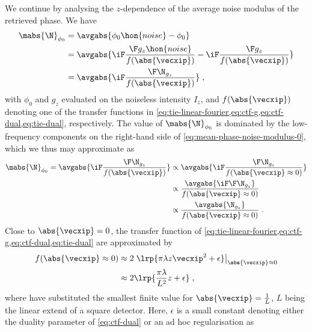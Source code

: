\documentclass[
twoside,
openright,
titlepage,
numbers=noenddot,
headinclude,
fleqn,
a4paper,
footinclude=true,
cleardoublepage=empty,
abstractoff,
BCOR=5mm,
paper=a4,
fontsize=11pt,
british,ngerman,american,
]{scrreprt}
\begin{document}
We continue by analysing the $z$-dependence of the average noise
modulus of the retrieved phase.  We have
\begin{equation}
  \label{eq:mean-phase-noise-modulus-0}
  \begin{split}
      \mabs{\N}_{\phi_0} & = \avgabs{\phi_0\hon{noise}-\phi_0}
      \\ &= \avgabs{ \iF\frac{\F g_z\hon{noise}}{f(\abs{\vecxip})} 
      -\iF\frac{\F g_z}{f(\abs{\vecxip})} }
  \\ & =\avgabs{ \iF\frac{\F \N_{g_z}}{f(\abs{\vecxip})} } \;,
  \end{split}
\end{equation}
with $\phi_0$ and $g_z$ evaluated on the noiseless intensity $I_z$,
and $f(\abs{\vecxip})$ denoting one of the transfer functions in
\cref{eq:tie-linear-fourier,eq:ctf-g,eq:ctf-dual,eq:tie-dual},
respectively.  The value of $\mabs{\N}_{\phi_0}$ is dominated by the
low-frequency components on the right-hand side of
\cref{eq:mean-phase-noise-modulus-0}, which we thus may approximate as
\begin{equation}
  \label{eq:mean-phase-noise-modulus-1}
  \begin{split}
    \mabs{\N}_{\phi_0} = 
    \avgabs{ \iF\frac{\F \N_{g_z}}{f(\abs{\vecxip})} }
    & \propto \avgabs{ \iF\frac{\F \N_{g_z}}
      { f(\abs{\vecxip}\approx 0) } }
    \\ & \propto \frac{\avgabs{ \iF \F\N_{g_z} }}
    {f(\abs{\vecxip}\approx 0)} 
    \\ & \propto \frac{\avgabs{ \N_{g_z} }}
    {f(\abs{\vecxip}\approx 0)} \;.
  \end{split}
\end{equation}
Close to $\abs{\vecxip}=0$, the transfer function of
\cref{eq:tie-linear-fourier,eq:ctf-g,eq:ctf-dual,eq:tie-dual} are
approximated by
\begin{equation}
  \label{eq:transfer-function-0}
  \begin{split}
    f(\abs{\vecxip}\approx 0) 
    & \approx 2\left.\lrp{\pi\lambda z\vecxip^2 
    +\epsilon}\right|_{\abs{\vecxip}\approx 0}
  \\ & \approx 2\lrp{\frac{\pi\lambda}{L^2}z +\epsilon} \;,
  \end{split}
\end{equation}
where have substituted the smallest finite value for
$\abs{\vecxip}=\frac{1}{L}$, $L$ being the linear extend of a square
detector.  Here, $\epsilon$ is a small constant denoting either the
duality parameter of \cref{eq:ctf-dual} or an ad hoc regularisation as
\end{document}
